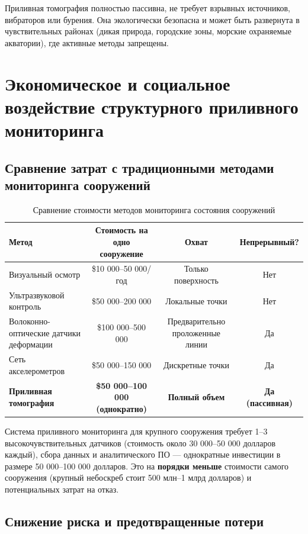 \documentclass[12pt,a4paper]{article}
\theoremstyle{remark}
\begin{document}
	Приливная томография полностью пассивна, не требует взрывных источников, вибраторов или бурения. Она экологически безопасна и может быть развернута в чувствительных районах (дикая природа, городские зоны, морские охраняемые акватории), где активные методы запрещены.
	
	\section{Экономическое и социальное воздействие структурного приливного мониторинга}
	\label{sec:structural-economics}
	
	\subsection{Сравнение затрат с традиционными методами мониторинга сооружений}
	
	\begin{table}[htbp]
		\centering
		\caption{Сравнение стоимости методов мониторинга состояния сооружений}
		\label{tab:structural-costs}
		\small
		\begin{tabular}{lccc}
			\toprule
			\textbf{Метод} & \textbf{Стоимость на одно сооружение} & \textbf{Охват} & \textbf{Непрерывный?} \\
			\midrule
			Визуальный осмотр & \$10 000–50 000/год & Только поверхность & Нет \\
			Ультразвуковой контроль & \$50 000–200 000 & Локальные точки & Нет \\
			Волоконно-оптические датчики деформации & \$100 000–500 000 & Предварительно проложенные линии & Да \\
			Сеть акселерометров & \$50 000–150 000 & Дискретные точки & Да \\
			\textbf{Приливная томография} & \textbf{\$50 000–100 000 (однократно)} & \textbf{Полный объем} & \textbf{Да (пассивная)} \\
			\bottomrule
		\end{tabular}
	\end{table}
	
	Система приливного мониторинга для крупного сооружения требует 1–3 высокочувствительных датчиков (стоимость около 30 000–50 000 долларов каждый), сбора данных и аналитического ПО — однократные инвестиции в размере 50 000–100 000 долларов. Это на \textbf{порядки меньше} стоимости самого сооружения (крупный небоскреб стоит 500 млн–1 млрд долларов) и потенциальных затрат на отказ.
	
	\subsection{Снижение риска и предотвращенные потери}
	
\end{document}
